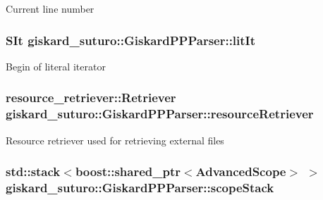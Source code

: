 Current line number \hypertarget{classgiskard__suturo_1_1GiskardPPParser_aad16704f4a92d18367568749642da53a}{
\subsubsection[{lit\-It}]{\setlength{\rightskip}{0pt plus 5cm}S\-It giskard\-\_\-suturo\-::\-Giskard\-P\-P\-Parser\-::lit\-It\hspace{0.3cm}{\ttfamily [private]}}}\label{classgiskard__suturo_1_1GiskardPPParser_aad16704f4a92d18367568749642da53a}
Begin of literal iterator \hypertarget{classgiskard__suturo_1_1GiskardPPParser_a6ae65d54b237bd3321091310825b702b}{
\subsubsection[{resource\-Retriever}]{\setlength{\rightskip}{0pt plus 5cm}resource\-\_\-retriever\-::\-Retriever giskard\-\_\-suturo\-::\-Giskard\-P\-P\-Parser\-::resource\-Retriever\hspace{0.3cm}{\ttfamily [private]}}}\label{classgiskard__suturo_1_1GiskardPPParser_a6ae65d54b237bd3321091310825b702b}
Resource retriever used for retrieving external files \hypertarget{classgiskard__suturo_1_1GiskardPPParser_ae8670c50103c477e9a3a1774bcd0cfbc}{
\subsubsection[{scope\-Stack}]{\setlength{\rightskip}{0pt plus 5cm}std\-::stack$<$boost\-::shared\-\_\-ptr$<${\bf Advanced\-Scope}$>$ $>$ giskard\-\_\-suturo\-::\-Giskard\-P\-P\-Parser\-::scope\-Stack\hspace{0.3cm}{\ttfamily [private]}}}\label{classgiskard__suturo_1_1GiskardPPParser_ae8670c50103c477e9a3a1774bcd0cfbc}
